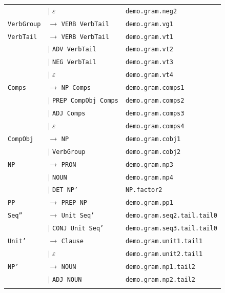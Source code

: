 \begin{longtable}{@{}l l l@{}}
\texttt{} & $\mid$ $\varepsilon$ & \scriptsize\texttt{demo.gram.neg2} \\
\addlinespace
\texttt{VerbGroup} & $\rightarrow$ \texttt{VERB VerbTail} & \scriptsize\texttt{demo.gram.vg1} \\
\addlinespace
\texttt{VerbTail} & $\rightarrow$ \texttt{VERB VerbTail} & \scriptsize\texttt{demo.gram.vt1} \\
\texttt{} & $\mid$ \texttt{ADV VerbTail} & \scriptsize\texttt{demo.gram.vt2} \\
\texttt{} & $\mid$ \texttt{NEG VerbTail} & \scriptsize\texttt{demo.gram.vt3} \\
\texttt{} & $\mid$ $\varepsilon$ & \scriptsize\texttt{demo.gram.vt4} \\
\addlinespace
\texttt{Comps} & $\rightarrow$ \texttt{NP Comps} & \scriptsize\texttt{demo.gram.comps1} \\
\texttt{} & $\mid$ \texttt{PREP CompObj Comps} & \scriptsize\texttt{demo.gram.comps2} \\
\texttt{} & $\mid$ \texttt{ADJ Comps} & \scriptsize\texttt{demo.gram.comps3} \\
\texttt{} & $\mid$ $\varepsilon$ & \scriptsize\texttt{demo.gram.comps4} \\
\addlinespace
\texttt{CompObj} & $\rightarrow$ \texttt{NP} & \scriptsize\texttt{demo.gram.cobj1} \\
\texttt{} & $\mid$ \texttt{VerbGroup} & \scriptsize\texttt{demo.gram.cobj2} \\
\addlinespace
\texttt{NP} & $\rightarrow$ \texttt{PRON} & \scriptsize\texttt{demo.gram.np3} \\
\texttt{} & $\mid$ \texttt{NOUN} & \scriptsize\texttt{demo.gram.np4} \\
\texttt{} & $\mid$ \texttt{DET NP'} & \scriptsize\texttt{NP.factor2} \\
\addlinespace
\texttt{PP} & $\rightarrow$ \texttt{PREP NP} & \scriptsize\texttt{demo.gram.pp1} \\
\addlinespace
\texttt{Seq''} & $\rightarrow$ \texttt{Unit Seq'} & \scriptsize\texttt{demo.gram.seq2.tail.tail0} \\
\texttt{} & $\mid$ \texttt{CONJ Unit Seq'} & \scriptsize\texttt{demo.gram.seq3.tail.tail0} \\
\addlinespace
\texttt{Unit'} & $\rightarrow$ \texttt{Clause} & \scriptsize\texttt{demo.gram.unit1.tail1} \\
\texttt{} & $\mid$ $\varepsilon$ & \scriptsize\texttt{demo.gram.unit2.tail1} \\
\addlinespace
\texttt{NP'} & $\rightarrow$ \texttt{NOUN} & \scriptsize\texttt{demo.gram.np1.tail2} \\
\texttt{} & $\mid$ \texttt{ADJ NOUN} & \scriptsize\texttt{demo.gram.np2.tail2} \\
\addlinespace
\end{longtable}
